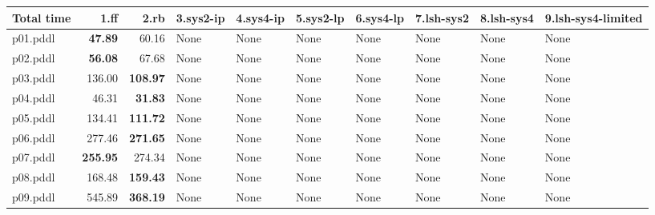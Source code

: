 \documentclass{article}
\begin{document}
\begin{tabular}{@{}lrrrrrrrrr@{}}
Total time & 1.ff & 2.rb & 3.sys2-ip & 4.sys4-ip & 5.sys2-lp & 6.sys4-lp & 7.lsh-sys2 & 8.lsh-sys4 & 9.lsh-sys4-limited \\
\midrule
p01.pddl & \textbf{47.89} & 60.16 & \multicolumn{1}{|l|}{None} & \multicolumn{1}{|l|}{None} & \multicolumn{1}{|l|}{None} & \multicolumn{1}{|l|}{None} & \multicolumn{1}{|l|}{None} & \multicolumn{1}{|l|}{None} & \multicolumn{1}{|l|}{None} \\
p02.pddl & \textbf{56.08} & 67.68 & \multicolumn{1}{|l|}{None} & \multicolumn{1}{|l|}{None} & \multicolumn{1}{|l|}{None} & \multicolumn{1}{|l|}{None} & \multicolumn{1}{|l|}{None} & \multicolumn{1}{|l|}{None} & \multicolumn{1}{|l|}{None} \\
p03.pddl & 136.00 & \textbf{108.97} & \multicolumn{1}{|l|}{None} & \multicolumn{1}{|l|}{None} & \multicolumn{1}{|l|}{None} & \multicolumn{1}{|l|}{None} & \multicolumn{1}{|l|}{None} & \multicolumn{1}{|l|}{None} & \multicolumn{1}{|l|}{None} \\
p04.pddl & 46.31 & \textbf{31.83} & \multicolumn{1}{|l|}{None} & \multicolumn{1}{|l|}{None} & \multicolumn{1}{|l|}{None} & \multicolumn{1}{|l|}{None} & \multicolumn{1}{|l|}{None} & \multicolumn{1}{|l|}{None} & \multicolumn{1}{|l|}{None} \\
p05.pddl & 134.41 & \textbf{111.72} & \multicolumn{1}{|l|}{None} & \multicolumn{1}{|l|}{None} & \multicolumn{1}{|l|}{None} & \multicolumn{1}{|l|}{None} & \multicolumn{1}{|l|}{None} & \multicolumn{1}{|l|}{None} & \multicolumn{1}{|l|}{None} \\
p06.pddl & 277.46 & \textbf{271.65} & \multicolumn{1}{|l|}{None} & \multicolumn{1}{|l|}{None} & \multicolumn{1}{|l|}{None} & \multicolumn{1}{|l|}{None} & \multicolumn{1}{|l|}{None} & \multicolumn{1}{|l|}{None} & \multicolumn{1}{|l|}{None} \\
p07.pddl & \textbf{255.95} & 274.34 & \multicolumn{1}{|l|}{None} & \multicolumn{1}{|l|}{None} & \multicolumn{1}{|l|}{None} & \multicolumn{1}{|l|}{None} & \multicolumn{1}{|l|}{None} & \multicolumn{1}{|l|}{None} & \multicolumn{1}{|l|}{None} \\
p08.pddl & 168.48 & \textbf{159.43} & \multicolumn{1}{|l|}{None} & \multicolumn{1}{|l|}{None} & \multicolumn{1}{|l|}{None} & \multicolumn{1}{|l|}{None} & \multicolumn{1}{|l|}{None} & \multicolumn{1}{|l|}{None} & \multicolumn{1}{|l|}{None} \\
p09.pddl & 545.89 & \textbf{368.19} & \multicolumn{1}{|l|}{None} & \multicolumn{1}{|l|}{None} & \multicolumn{1}{|l|}{None} & \multicolumn{1}{|l|}{None} & \multicolumn{1}{|l|}{None} & \multicolumn{1}{|l|}{None} & \multicolumn{1}{|l|}{None} \\

\end{tabular}
\end{document}
